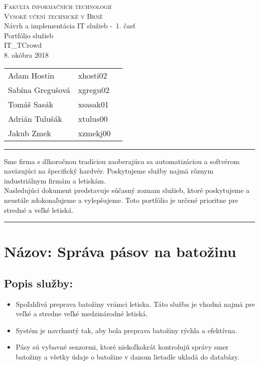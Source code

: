 \documentclass[a4paper, 11pt]{article}
\begin{document}
\begin{center}
\Huge
\textsc{Fakulta informačních technologií\\
Vysoké učení technické v Brně}
\\[84mm]
\LARGE Návrh a implementácia IT služieb \--\ 1. časť\\
\Huge Portfólio služieb\\
\vspace{3.5cm}
\LARGE IT\_TCrowd\\
\Large 8. okóbra 2018
\end{center}

\hfill

\begin{minipage}[l]{0.6 \textwidth}
\Large
\begin{tabular}{l l l}
Adam Hostin  & xhosti02\\
Sabína Gregušová & xgregu02\\
Tomáš Sasák & xsasak01 \\
Adrián Tulušák  & xtulus00 \\
Jakub Zmek & xzmekj00 \\
\end{tabular}
\end{minipage}
\thispagestyle{empty}
\clearpage

\setcounter{page}{1}
\noindent\rule{\textwidth}{1pt}
\begin{center}
Sme firma s dlhoročnou tradíciou zaoberajúca sa automatizáciou a softvérom naväzujúci na špecifický hardvér. Poskytujeme služby najmä rôznym industriálnym firmám a letiskám.  \\

Nasledujúci dokument predstavuje súčasný zoznam služieb, ktoré poskytujeme a neustále zdokonaľujeme a vylepšujeme. Toto portfólio je určené prioritne pre stredné a veľké letiská.\\
\end{center}
\noindent\rule{\textwidth}{1pt}


\section*{Názov: Správa pásov na batožinu}
\subsection*{Popis služby:}
\begin{itemize}
\item Spoľahlivá preprava batožiny vrámci letiska. Táto služba je vhodná najmä pre veľké a stredne veľké medzinárodné letiská. 
\item Systém je navrhnutý tak, aby bola preprava batožiny rýchla a efektívna. 
\item Pásy sú vybavné senzormi, ktoré niekoľkokrát kontrolujú správy smer batožiny a všetky údaje o batožine v danom lietadle ukladá do databázy.
\end{itemize}
\end{document}
